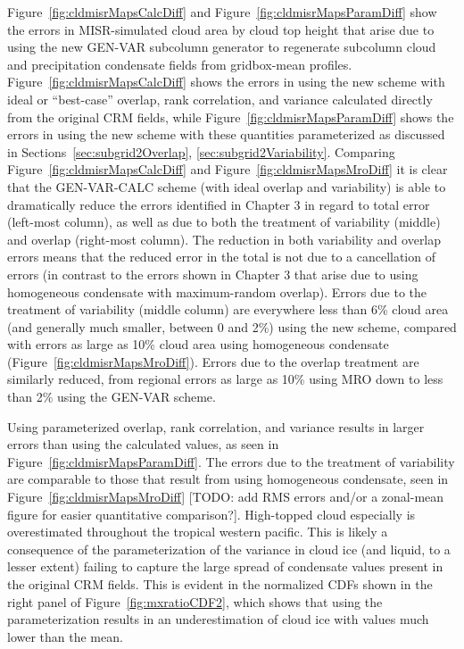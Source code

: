 Figure~\ref{fig:cldmisrMapsCalcDiff} and
Figure~\ref{fig:cldmisrMapsParamDiff} show the errors in MISR-simulated
cloud area by cloud top height that arise due to using the new GEN-VAR
subcolumn generator to regenerate subcolumn cloud and precipitation
condensate fields from gridbox-mean profiles.
Figure~\ref{fig:cldmisrMapsCalcDiff} shows the errors in using the new
scheme with ideal or ``best-case'' overlap, rank correlation, and
variance calculated directly from the original CRM fields, while
Figure~\ref{fig:cldmisrMapsParamDiff} shows the errors in using the new
scheme with these quantities parameterized as discussed in
Sections~\ref{sec:subgrid2Overlap}, \ref{sec:subgrid2Variability}.
Comparing Figure~\ref{fig:cldmisrMapsCalcDiff} and
Figure~\ref{fig:cldmisrMapsMroDiff} it is clear that the GEN-VAR-CALC
scheme (with ideal overlap and variability) is able to dramatically
reduce the errors identified in Chapter 3 in regard to total error
(left-most column), as well as due to both the treatment of variability
(middle) and overlap (right-most column). The reduction in both
variability and overlap errors means that the reduced error in the total
is not due to a cancellation of errors (in contrast to the errors shown
in Chapter 3 that arise due to using homogeneous condensate with
maximum-random overlap). Errors due to the treatment of variability
(middle column) are everywhere less than 6\% cloud area (and generally
much smaller, between 0 and 2\%) using the new scheme, compared with
errors as large as 10\% cloud area using homogeneous condensate
(Figure~\ref{fig:cldmisrMapsMroDiff}). Errors due to the overlap
treatment are similarly reduced, from regional errors as large as 10\%
using MRO down to less than 2\% using the GEN-VAR scheme.

Using parameterized overlap, rank correlation, and variance results in
larger errors than using the calculated values, as seen in
Figure~\ref{fig:cldmisrMapsParamDiff}. The errors due to the treatment
of variability are comparable to those that result from using
homogeneous condensate, seen in Figure~\ref{fig:cldmisrMapsMroDiff}
{[}TODO: add RMS errors and/or a zonal-mean figure for easier
quantitative comparison?{]}. High-topped cloud especially is
overestimated throughout the tropical western pacific. This is likely a
consequence of the parameterization of the variance in cloud ice (and
liquid, to a lesser extent) failing to capture the large spread of
condensate values present in the original CRM fields. This is evident in
the normalized CDFs shown in the right panel of
Figure~\ref{fig:mxratioCDF2}, which shows that using the
parameterization results in an underestimation of cloud ice with values
much lower than the mean.

